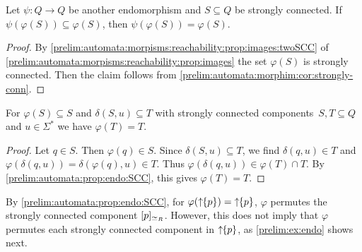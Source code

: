 \begin{corollary}
	Let $\psi \colon Q \to Q$ be another endomorphism
	and $S \subseteq Q$ be strongly connected.
	If $\psi(\varphi(S)) \subseteq \varphi(S)$,
	then $\psi(\varphi(S)) = \varphi(S)$.	
\end{corollary}
\begin{proof}
	By \cref{prelim:automata:morpisms:reachability:prop:images:twoSCC} of \cref{prelim:automata:morpisms:reachability:prop:images}
	the set $\varphi(S)$ is strongly connected.
	Then the claim follows from \cref{prelim:automata:morphim:cor:strongly-conn}.	
\end{proof}

\begin{corollary}
	For $\varphi(S) \subseteq S$ and $\delta(S, u) \subseteq T$ with strongly connected components~$S, T \subseteq Q$ 
	and $u \in \Sigma^*$ we have $\varphi(T) = T$.	
\end{corollary}
\begin{proof}
	Let $q \in S$. Then $\varphi(q) \in S$.
	Since $\delta(S, u) \subseteq T$,
	we find $\delta(q, u) \in T$ and $\varphi(\delta(q, u)) = \delta(\varphi(q), u) \in T$.	
	Thus $\varphi(\delta(q, u)) \in \varphi(T) \cap T$.
	By \cref{prelim:automata:prop:endo:SCC},
	this gives $\varphi(T) = T$.
\end{proof}

By \cref{prelim:automata:prop:endo:SCC},
for $\varphi(\mbox{\ensuremath{\displaystyle \uparrow \!\!\{p\}}}) = \mbox{\ensuremath{\displaystyle \uparrow \!\!\{p\}}}$, $\varphi$ permutes the strongly connected component
$[p]_{\simeq_R}$.
However, this does not imply
that $\varphi$ permutes each strongly connected component in $\mbox{\ensuremath{\displaystyle \uparrow \!\!\{p\}}}$,
as \cref{prelim:ex:endo} shows next.

